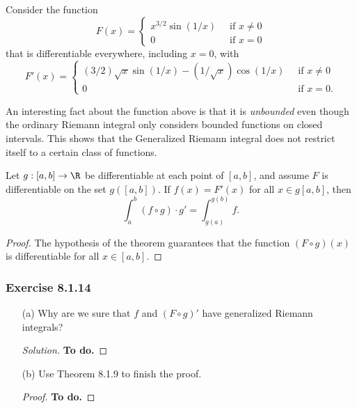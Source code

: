 Consider the function 
\[  F(x) = 
\begin{cases}
    x^{3/2} \sin(1/x) \ &\text{ if } x \neq 0 \\
    0 \ &\text{ if } x = 0
\end{cases} \]
that is differentiable everywhere, including \( x = 0  \), with 
\[  F'(x) = 
\begin{cases}
    (3/2)\sqrt{ x }  \sin (1/x) - (1 / \sqrt{ x } ) \cos(1/x) \ &\text{ if } x \neq 0 \\
    0 \ &\text { if } x = 0.
\end{cases} \]

An interesting fact about the function above is that it is \textit{unbounded} even though the ordinary Riemann integral only considers bounded functions on closed intervals. This shows that the Generalized Riemann integral does not restrict itself to a certain class of functions. 
\begin{tcolorbox}
    \begin{thm} Let \(g: [a,b] \to \R  \) be differentiable at each point of \( [a,b]  \), and assume \( F  \) is differentiable on the set \( g([a,b] ) \). If \( f(x) = F'(x)  \) for all \( x \in g[a,b]  \), then 
        \[  \int_{ a }^{ b } (f \circ g) \cdot g' = \int_{ g(a) }^{ g(b)  } f. \]
\end{thm}
\end{tcolorbox}

\begin{proof}
    The hypothesis of the theorem guarantees that the function \( (F \circ g )(x)  \) is differentiable for all \( x \in [a,b] \).
\end{proof}

\subsubsection{Exercise 8.1.14} 
\begin{enumerate}
    \item[(a)] Why are we sure that \( f  \) and \( (F \circ g)' \) have generalized Riemann integrals? 
        \begin{proof}[Solution]
            \textbf{To do.}
        \end{proof}
    \item[(b)] Use Theorem 8.1.9 to finish the proof.
        \begin{proof}
            \textbf{To do.}
        \end{proof}
\end{enumerate}




